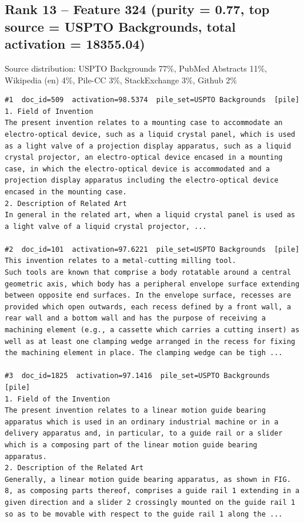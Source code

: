 \subsection*{Rank 13 -- Feature 324 (purity = 0.77, top source = USPTO Backgrounds, total activation = 18355.04)}

Source distribution: USPTO Backgrounds 77\%, PubMed Abstracts 11\%, Wikipedia (en) 4\%, Pile-CC 3\%, StackExchange 3\%, Github 2\%

\begin{verbatim}
#1  doc_id=509  activation=98.5374  pile_set=USPTO Backgrounds  [pile]
1. Field of Invention
The present invention relates to a mounting case to accommodate an electro-optical device, such as a liquid crystal panel, which is used as a light valve of a projection display apparatus, such as a liquid crystal projector, an electro-optical device encased in a mounting case, in which the electro-optical device is accommodated and a projection display apparatus including the electro-optical device encased in the mounting case.
2. Description of Related Art
In general in the related art, when a liquid crystal panel is used as a light valve of a liquid crystal projector, ...

#2  doc_id=101  activation=97.6221  pile_set=USPTO Backgrounds  [pile]
This invention relates to a metal-cutting milling tool.
Such tools are known that comprise a body rotatable around a central geometric axis, which body has a peripheral envelope surface extending between opposite end surfaces. In the envelope surface, recesses are provided which open outwards, each recess defined by a front wall, a rear wall and a bottom wall and has the purpose of receiving a machining element (e.g., a cassette which carries a cutting insert) as well as at least one clamping wedge arranged in the recess for fixing the machining element in place. The clamping wedge can be tigh ...

#3  doc_id=1825  activation=97.1416  pile_set=USPTO Backgrounds  [pile]
1. Field of the Invention
The present invention relates to a linear motion guide bearing apparatus which is used in an ordinary industrial machine or in a delivery apparatus and, in particular, to a guide rail or a slider which is a composing part of the linear motion guide bearing apparatus.
2. Description of the Related Art
Generally, a linear motion guide bearing apparatus, as shown in FIG. 8, as composing parts thereof, comprises a guide rail 1 extending in a given direction and a slider 2 crossingly mounted on the guide rail 1 so as to be movable with respect to the guide rail 1 along the ...


\end{verbatim}
